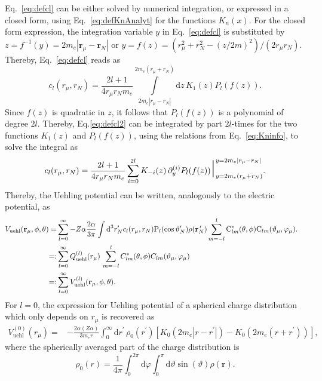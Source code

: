 Eq.~\eqref{eq:defcl} can be either solved by numerical integration, or expressed in a closed form, using Eq.~\eqref{eq:defKnAnalyt} for the functions $K_n(x)$. For the closed form expression, the integration variable $y$ in Eq.~\eqref{eq:defcl} is substituted by $z=f^{-1}(y)=2m_e{|\mathbf{r}_\mu - \mathbf{r}_N|}$ or $y=f(z)=(r_\mu^2+r_N^2 -(z/2m)^2)/(2r_\mu r_N)$. Thereby, Eq.~\eqref{eq:defcl} reads as
\begin{equation}
c_l(r_\mu,r_N)=\frac{2l+1}{4 r_\mu r_N m_e}\mathop\int\limits_{2m_e{|r_\mu - r_N|}}^{2m_e{(r_\mu + r_N)}} \text{d}z\, K_1(z)P_l(f(z)).
\label{eq:defcl2}
\end{equation}
Since $f(z)$ is quadratic in $z$, it follows that $P_l(f(z))$ is a polynomial of degree $2l$. Thereby, Eq.\eqref{eq:defcl2} can be integrated by part $2l$-times for the two functions $K_1(z)$ and $P_l(f(z))$, using the relations from Eq.~\eqref{eq:Kninfo}, to solve the integral as
\begin{equation}
c_l(r_\mu,r_N)=\frac{2l+1}{4 r_\mu r_N m_e}
\sum\limits_{i=0}^{2l} K_{-i}(z)\,\partial^{(i)}_yP_l(f(z))\text{\huge |}^{y=2m_e{|r_\mu - r_N|}}_{y=2m_e{(r_\mu + r_N)}}.
\label{eq:defcl3}
\end{equation}
Thereby, the Uehling potential can be written, analogously to the electric potential, as
\begin{align}
V_{\text{uehl}}(\mathbf{r}_\mu,\phi,\theta)=&\sum_{l=0}^\infty-Z\alpha\frac{2\alpha}{3\pi}
 \int \text{d}^3r^{\prime}_N c_l(r_\mu,r_N)\text{P}_{l}(\cos \vartheta_N^{\prime})\rho(\mathbf{r}_N^{\,\prime})\sum_{m=-l}^l \text{C}^*_{lm}(\theta,\phi)\text{C}_{lm}(\vartheta_\mu,\varphi_\mu).\notag\\
=:&\sum_{l=0}^\infty Q^{(l)}_{\text{uehl}}(r_\mu)\,\sum_{m=-l}^lC^*_{lm}(\theta,\phi)C_{lm}(\vartheta_\mu,\varphi_\mu)&\notag\\
=:& \sum_{l=0}^\infty V^{(l)}_{\text{uehl}}(\mathbf{r}_\mu,\phi,\theta).
\label{eq:defmultiuehl}
\end{align}
For $l=0$, the expression for Uehling potential of a spherical charge distribution~\cite{Fullerton1976} which only depends on $r_\mu$ is recovered as
\begin{align}
\label{eq:sph_uehl}
V^{(0)}_{\text{uehl}}(r_\mu)=& -\frac{2\alpha (Z\alpha)}{3 m_e r}\int_0^\infty \text{d}r^{\prime}\,\rho_0(r^\prime)\left[K_0(2m_e|r-r^\prime|)-K_0(2m_e(r+r^\prime))\right],
\end{align}
where the spherically averaged part of the charge distribution is
\begin{equation}
\rho_0(r)=\frac{1}{4\pi}\int_0^{2\pi}\text{d}\varphi\int_0^\pi\text{d}\vartheta \sin(\vartheta)\rho(\mathbf{r}).
\end{equation}
